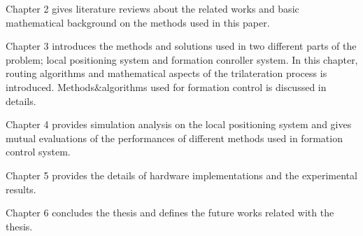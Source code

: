 Chapter 2 gives literature reviews about the related works and basic mathematical background on the methods used in this paper.

Chapter 3 introduces the methods and solutions used in two different parts of the problem; local positioning system and formation conroller system. In this chapter, routing algorithms and mathematical aspects of the trilateration process is introduced. Methods$\&$algorithms used for formation control is discussed in details.

Chapter 4 provides simulation analysis on the local positioning system and gives mutual evaluations of the performances of different methods used in formation control system.

Chapter 5 provides the details of hardware implementations and the experimental results.

Chapter 6 concludes the thesis and defines the future works related with the thesis.